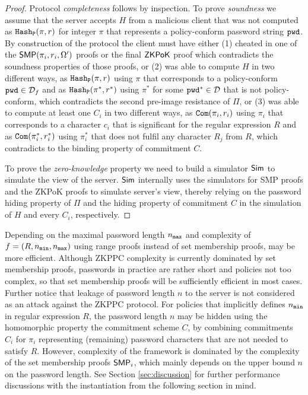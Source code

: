 \begin{proof}
Protocol \emph{completeness} follows by inspection.
To prove \emph{soundness} we assume that the server accepts $H$ from a malicious client that was not computed as $\mathtt{Hash_P}(\pi,r)$ for integer $\pi$ that represents a policy-conform password string $\mathtt{pwd}$. 
By construction of the protocol the client must have either 
(1) cheated in one of the $\mathsf{SMP}(\pi_i,r_i,\Omega')$ proofs or the final $\mathsf{ZKPoK}$ proof which contradicts the soundness properties of those proofs, or 
(2) was able to compute $H$ in two different ways, as $\mathtt{Hash_P}(\pi,r)$ using $\pi$ that corresponds to a policy-conform $\mathtt{pwd}\in\mathcal{D}_f$ and as $\mathtt{Hash_P}(\pi^\ast,r^\ast)$ using $\pi^\ast$ for some $\mathtt{pwd}^\ast\in\mathcal{D}$ that is not policy-conform, which contradicts the second pre-image resistance of $\Pi$, or 
(3) was able to compute at least one $C_i$ in two different ways, as $\mathtt{Com}(\pi_i, r_i)$ using $\pi_i$  that corresponds to a character $c_i$ that is significant for the regular expression $R$ and as $\mathtt{Com}(\pi^\ast_i, r^\ast_i)$ using $\pi^\ast_i$ that does not fulfil any character $R_j$ from $R$, which contradicts to the binding property of commitment $C$.

To prove the \emph{zero-knowledge} property we need to build a simulator $\mathsf{Sim}$ to simulate the view of the server. 
$\mathsf{Sim}$ internally uses the simulators for SMP proofs and the \ac{ZKPoK} proofs to simulate server's view, thereby relying on the password hiding property of $\Pi$ and the hiding property of commitment $C$ in the simulation of $H$ and every $C_i$, respectively.
\end{proof}

\begin{remark}\label{rangeproofs}
Depending on the maximal password length ${n_\mathtt{max}}$ and complexity of $f=(R,{n_\mathtt{min}},{n_\mathtt{max}})$ using range proofs instead of set membership proofs, may be more efficient.
Although \ac{ZKPPC} complexity is currently dominated by set membership proofs, passwords in practice are rather short and policies not too complex, so that set membership proofs will be sufficiently efficient in most cases.
Further notice that leakage of password length $n$ to the server is not considered as an attack against the \ac{ZKPPC} protocol. 
For policies that implicitly defines ${n_\mathtt{min}}$ in regular expression $R$, the password length $n$ may be hidden using the homomorphic property the commitment scheme $C$, \ie by combining commitments $C_i$ for $\pi_i$ representing (remaining) password characters that are not needed to satisfy $R$.
However, complexity of the framework is dominated by the complexity of the set membership proofs $\mathsf{SMP}_i$, which mainly depends on the upper bound $n$ on the password length.
See Section \ref{sec:discussion} for further performance discussions with the instantiation from the following section in mind.
\end{remark}

